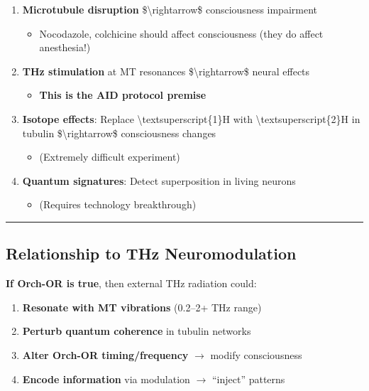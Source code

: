 \begin{enumerate}
\def\labelenumi{\arabic{enumi}.}
\tightlist
\item
  \textbf{Microtubule disruption} \$\textbackslash rightarrow\$
  consciousness impairment

  \begin{itemize}
  \tightlist
  \item
    Nocodazole, colchicine should affect consciousness (they do affect
    anesthesia!)
  \end{itemize}
\item
  \textbf{THz stimulation} at MT resonances
  \$\textbackslash rightarrow\$ neural effects

  \begin{itemize}
  \tightlist
  \item
    \textbf{This is the AID protocol premise}
  \end{itemize}
\item
  \textbf{Isotope effects}: Replace \textbackslash textsuperscript\{1\}H
  with \textbackslash textsuperscript\{2\}H in tubulin
  \$\textbackslash rightarrow\$ consciousness changes

  \begin{itemize}
  \tightlist
  \item
    (Extremely difficult experiment)
  \end{itemize}
\item
  \textbf{Quantum signatures}: Detect superposition in living neurons

  \begin{itemize}
  \tightlist
  \item
    (Requires technology breakthrough)
  \end{itemize}
\end{enumerate}

\begin{center}\rule{0.5\linewidth}{0.5pt}\end{center}

\subsection{Relationship to THz Neuromodulation}\label{relationship-to-thz-neuromodulation}

\textbf{If Orch-OR is true}, then external THz radiation could:

\begin{enumerate}
\def\labelenumi{\arabic{enumi}.}
\tightlist
\item \textbf{Resonate with MT vibrations} (0.2--2+ THz range)
\item \textbf{Perturb quantum coherence} in tubulin networks
\item \textbf{Alter Orch-OR timing/frequency} $\rightarrow$ modify consciousness
\item \textbf{Encode information} via modulation $\rightarrow$ ``inject'' patterns
\end{enumerate}

